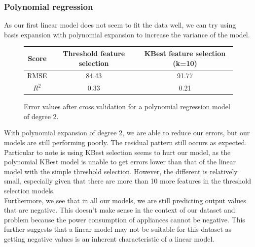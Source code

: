 \documentclass{article}
\newcommand{\n}[0]{\\[\baselineskip]}
\begin{document}
\subsubsection{Polynomial regression}
As our first linear model does not seem to fit the data well, we can try using basis expansion with polynomial expansion to increase the variance of the model. 
\begin{figure}[H]
\centering
\begin{tabular}{| c | c | c |}
\hline
\textbf{Score} &  \textbf{Threshold feature selection} & \textbf{KBest feature selection (k=10)} \\
\hline
RMSE & 84.43 & 91.77 \\
\hline
\textbf{$R^{2}$} & 0.33 & 0.21 \\
\hline
\end{tabular}
\caption{Error values after cross validation for a polynomial regression model of degree 2.}
\end{figure}
\noindent
With polynomial expansion of degree 2, we are able to reduce our errors, but our models are still performing poorly. The residual pattern still occurs as expected. Particular to note is using KBest selection seems to hurt our model, as the polynomial KBest model is unable to get errors lower than that of the linear model with the simple threshold selection. However, the different is relatively small, especially given that there are more than 10 more features in the threshold selection models. 
\n
Furthermore, we see that in all our models, we are still predicting output values that are negative. This doesn't make sense in the context of our dataset and problem because the power consumption of appliances cannot be negative. This further suggests that a linear model may not be suitable for this dataset as getting negative values is an inherent characteristic of a linear model. 
\end{document}
